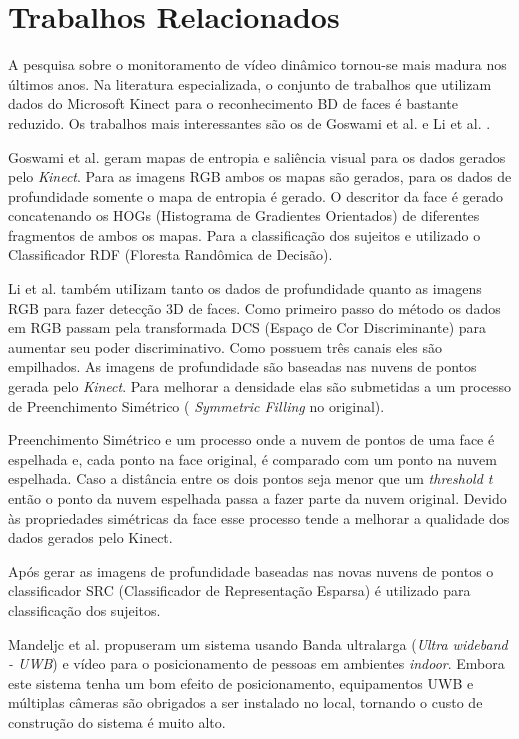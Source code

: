 \section{Trabalhos Relacionados}\label{sec:trabalhos-relacionados}

A pesquisa sobre o monitoramento de vídeo dinâmico tornou-se mais madura nos últimos anos. Na literatura especializada, o conjunto de trabalhos que utilizam dados do
Microsoft Kinect para o reconhecimento BD de faces é bastante reduzido. Os trabalhos mais interessantes são os de Goswami et al. \cite{goswami2013rgb} e Li et al. \cite{li2013using}.

Goswami et al. \cite{goswami2013rgb} geram mapas de entropia e saliência visual para os dados gerados pelo \textit{Kinect}. Para as imagens RGB ambos os mapas são gerados, para os dados de profundidade somente o mapa de entropia é gerado. O descritor da face é gerado concatenando os HOGs (Histograma de Gradientes Orientados) de diferentes fragmentos de ambos os mapas. Para a classificação dos sujeitos e utilizado o Classificador RDF (Floresta Randômica de Decisão).
 
Li et al. \cite{goswami2013rgb} também utiIizam tanto os dados de profundidade quanto as imagens RGB para fazer detecção 3D de faces. Como primeiro passo do método os dados em RGB passam pela transformada DCS (Espaço de Cor Discriminante) para aumentar seu poder discriminativo. Como possuem três canais eles são empilhados. As imagens de profundidade são baseadas nas nuvens de pontos gerada pelo  \textit{Kinect}. Para melhorar a densidade elas são submetidas a um processo de Preenchimento Simétrico ( \textit{Symmetric Filling} no original).
 
Preenchimento Simétrico e um processo onde a nuvem de pontos de uma face é espelhada e, cada ponto na face original, é comparado com um ponto na nuvem espelhada. Caso a distância entre os dois pontos seja menor que um  \textit{threshold t} então o ponto da nuvem espelhada passa a fazer parte da nuvem original. Devido às propriedades simétricas da face esse processo tende a melhorar a qualidade dos dados gerados pelo Kinect.
 
Após gerar as imagens de profundidade baseadas nas novas nuvens de pontos o classificador SRC (Classificador de Representação Esparsa) é utilizado para classificação dos sujeitos.
 
Mandeljc et al. \cite{mandeljc2012tracking} propuseram um sistema usando Banda ultralarga (\textit{Ultra wideband - UWB}) e vídeo para o posicionamento de pessoas em ambientes \textit{indoor}. Embora este sistema tenha um bom efeito de posicionamento, equipamentos UWB e múltiplas câmeras são obrigados a ser instalado no local, tornando o custo de construção do sistema é muito alto.

